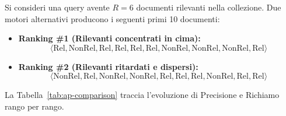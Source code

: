 \begin{example}
Si consideri una query avente $R = 6$ documenti rilevanti nella collezione. Due motori alternativi producono i seguenti primi 10 documenti:
\begin{itemize}
    \item \textbf{Ranking \#1 (Rilevanti concentrati in cima):}
    \[
    \langle \text{Rel}, \text{NonRel}, \text{Rel}, \text{Rel}, \text{Rel}, \text{Rel}, \text{NonRel}, \text{NonRel}, \text{NonRel}, \text{Rel} \rangle
    \]
    \item \textbf{Ranking \#2 (Rilevanti ritardati e dispersi):}
    \[
    \langle \text{NonRel}, \text{Rel}, \text{NonRel}, \text{NonRel}, \text{Rel}, \text{Rel}, \text{Rel}, \text{NonRel}, \text{Rel}, \text{Rel} \rangle
    \]
\end{itemize}
La Tabella~\ref{tab:ap-comparison} traccia l'evoluzione di Precisione e Richiamo rango per rango.

\begin{table}[H]
\centering
\small
{}
\caption{Confronto di Average Precision: Ranking \#1 premia la reattivit\`a posizionale anticipando i rilevanti.}
\label{tab:ap-comparison}
\end{table}


\end{example}
